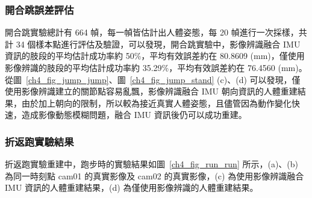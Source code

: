 \subsubsection*{開合跳誤差評估}
開合跳實驗總計有 664 幀，每一幀皆估計出人體姿態，每 20 幀進行一次採樣，共計 34 個樣本點進行評估及驗證，可以發現，開合跳實驗中，影像辨識融合 IMU 資訊的肢段的平均估計成功率約 50\%，平均有效誤差約在 80.8609 (mm)，僅使用影像辨識的肢段的平均估計成功率約 35.29\%，平均有效誤差約在 76.4560 (mm)。從圖~\ref{ch4_fig_jump_jump}、圖~\ref{ch4_fig_jump_stand} (c)、(d) 可以發現，僅使用影像辨識建立的關節點容易亂飄，影像辨識融合 IMU 朝向資訊的人體重建結果，由於加上朝向的限制，所以較為接近真實人體姿態，且儘管因為動作變化快速，造成影像動態模糊問題，融合 IMU 資訊後仍可以成功重建。

\clearpage

\subsubsection*{折返跑實驗結果}
折返跑實驗重建中，跑步時的實驗結果如圖~\ref{ch4_fig_run_run} 所示，(a)、(b) 為同一時刻點 cam01 的真實影像及 cam02 的真實影像，(c) 為使用影像辨識融合 IMU 資訊的人體重建結果，(d) 為僅使用影像辨識的人體重建結果。


